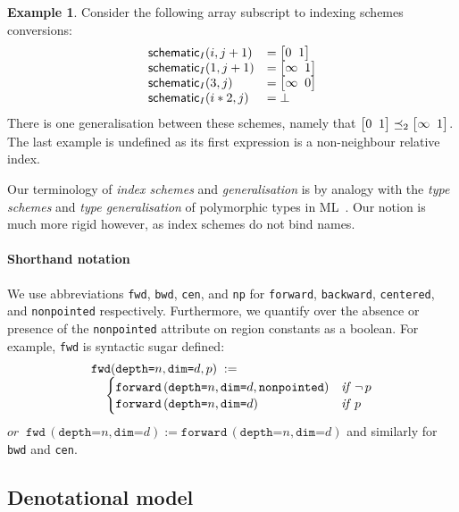 \documentclass[10pt,preprint,numbers]{sigplanconf}
\newcounter{block}
\theoremstyle{definition}
\newtheorem{example}[block]{Example}
\newcommand{\term}[1]{\texttt{#1}}
\newcommand{\stenFwd}[3]{\term{forward} \, (\term{depth=}#1,
  \term{dim=}#2{#3})}
\newcommand{\irrefl}{\texttt{nonpointed}}
\newcommand{\stenFwdS}[2]{\term{fwd} \, (\term{depth=}#1,
  \term{dim=}#2)}
\newcommand{\irreflS}{\texttt{np}}
\newcommand{\stenFwdSR}[3]{\term{fwd} (\term{depth=}#1,
  \term{dim=}#2, #3)}
\newcommand{\vtwoh}[2]{\setlength{\arraycolsep}{0em}
\left[\begin{array}{cc}#1 \; & \; #2\end{array}\right]}
\begin{document}
\begin{example}
Consider the following array subscript to indexing schemes
conversions:
%
\begin{align*}
\begin{array}{ll}
\schemeN{(i, j+1)} & =\vtwoh{0}{1} \\
\schemeN{(1, j+1)} & = \vtwoh{\infty}{1} \\
\schemeN{(3, j)} & = \vtwoh{\infty}{0} \\
\schemeN{(i*2, j)} & = \bot
\end{array}
\end{align*}
There is one generalisation between these
schemes, namely that $\vtwoh{0}{1} \preceq_2 \vtwoh{\infty}{1}$.
The last example is undefined as its first expression is a
non-neighbour relative index.
\end{example}

Our terminology of \emph{index schemes} and
\emph{generalisation} is by analogy
with the \emph{type schemes} and \emph{type generalisation} of
polymorphic types in ML~\cite{milner1978theory}. Our notion is
much more rigid however, as index schemes do not bind names.

\paragraph{Shorthand notation}

We use abbreviations
 \term{fwd}, \term{bwd}, \term{cen}, and \irreflS{}
for \term{forward}, \term{backward},
\term{centered}, and \irrefl{} respectively. Furthermore, 
we quantify over the absence or presence of the \irrefl{}
attribute on region constants as a boolean. For example,
\term{fwd} is syntactic sugar defined:
\begin{align*}
\hspace{-0.5em}
& \stenFwdSR{n}{d}{p}
\; := \; \\[-0.4em]
& \quad \begin{cases}
\stenFwd{n}{d}{, \irrefl} & \textit{if} \;\, \neg \, p \\[-0.1em]
\stenFwd{n}{d}{}  & \textit{if} \;\,  p
\end{cases}
\end{align*}
%
$\textit{or} \;\; \stenFwdS{n}{d} := \stenFwd{n}{d}{}$
and similarly for \term{bwd} and \term{cen}.


\subsection{Denotational model}
\end{document}
